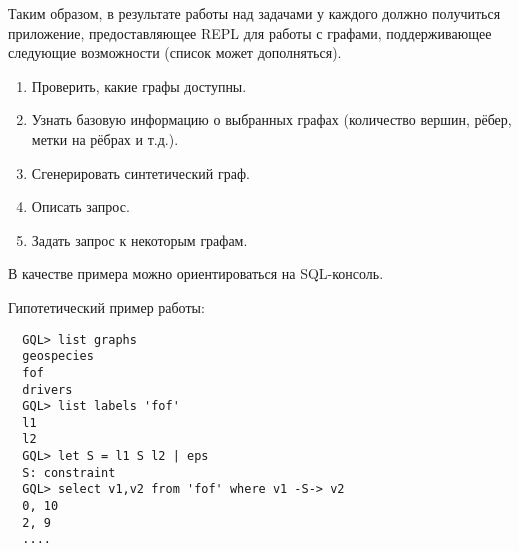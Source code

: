 Таким образом, в результате работы над задачами у каждого должно получиться приложение, предоставляющее REPL для работы с графами, поддерживающее следующие возможности (список может дополняться). 
\begin{enumerate}
\item Проверить, какие графы доступны.
\item Узнать базовую информацию о выбранных графах (количество вершин, рёбер, метки на рёбрах и т.д.).
\item Сгенерировать синтетический граф.
\item Описать запрос.
\item Задать запрос к некоторым графам.
\end{enumerate}
В качестве примера можно ориентироваться на SQL-консоль.

Гипотетический пример работы:
\begin{verbatim}
  GQL> list graphs
  geospecies
  fof
  drivers
  GQL> list labels 'fof'
  l1
  l2
  GQL> let S = l1 S l2 | eps
  S: constraint
  GQL> select v1,v2 from 'fof' where v1 -S-> v2
  0, 10
  2, 9
  ....
\end{verbatim}



